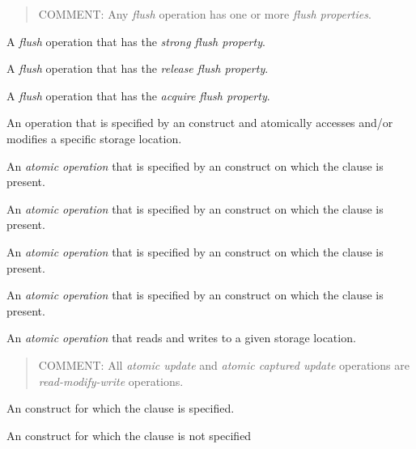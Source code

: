 \begin{quote}
COMMENT: Any \emph{flush} operation has one or more \emph{flush properties}.
\end{quote}
\glossarydefend

\glossarydefstart
A \emph{flush} operation that has the \emph{strong flush property}.
\glossarydefend

\glossarydefstart
A \emph{flush} operation that has the \emph{release flush property}.
\glossarydefend

\glossarydefstart
A \emph{flush} operation that has the \emph{acquire flush property}.
\glossarydefend

\glossarydefstart
An operation that is specified by an  construct and atomically
accesses and/or modifies a specific storage location.
\glossarydefend

\glossarydefstart
An \emph{atomic operation} that is specified by an  construct on which the
 clause is present.
\glossarydefend

\glossarydefstart
An \emph{atomic operation} that is specified by an  construct on which the
 clause is present.
\glossarydefend

\glossarydefstart
An \emph{atomic operation} that is specified by an  construct on which the
 clause is present.
\glossarydefend

\glossarydefstart
An \emph{atomic operation} that is specified by an  construct on which the
 clause is present.
\glossarydefend

\glossarydefstart
An \emph{atomic operation} that reads and writes to a given storage location.

\begin{quote}
COMMENT: All \emph{atomic update} and \emph{atomic captured update} operations
are \emph{read-modify-write} operations.
\end{quote}
\glossarydefend

\glossarydefstart
An  construct for which the  clause is specified.
\glossarydefend
\bigskip

\glossarydefstart
An  construct for which the  clause is not specified
\glossarydefend
\bigskip
\bigskip

